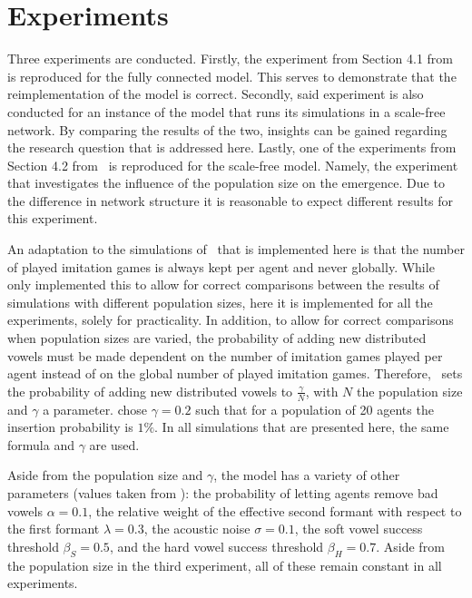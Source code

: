 \documentclass[11pt]{article}
\begin{document}
\section{Experiments\label{sec:exp}}
Three experiments are conducted. Firstly, the experiment from Section 4.1
from~ is reproduced for the fully connected model. This serves to demonstrate that the
reimplementation of the model is correct. Secondly, said experiment is also conducted for an instance of the model that runs its
simulations in a scale-free network. By comparing the results of the two, insights can be gained regarding the research question that
is addressed here. Lastly, one of the experiments from Section 4.2 from~ is reproduced for
the scale-free model. Namely, the experiment that investigates the influence of the population size on the emergence.
Due to the difference in network structure it is reasonable to expect different results for this experiment.

An adaptation to the simulations of~ that is
implemented here is that the number of played imitation games is always kept per agent and never globally.
While~ only implemented this to allow for correct comparisons
between the results of simulations with different population sizes, here it is implemented for all the experiments, solely for practicality.
In addition, to allow for correct comparisons when population sizes are varied, the probability of adding new distributed vowels must be made dependent on the
number of imitation games played per agent instead of on the global number of played imitation games. Therefore,~
sets the probability of adding new distributed vowels to $\frac{\gamma}{N}$, with $N$ the population size and $\gamma$ a parameter.
 chose $\gamma=0.2$ such that for a population of 20 agents the insertion probability is $1\%$.
In all simulations that are presented here, the same formula and $\gamma$ are used.

Aside from the population size and $\gamma$, the model has a variety of other parameters (values taken from ): the probability of letting agents
remove bad vowels $\alpha=0.1$, the relative weight of the effective second formant with respect to the first formant $\lambda=0.3$, the acoustic noise $\sigma=0.1$, the soft vowel success
threshold $\beta_S=0.5$, and the hard vowel success threshold $\beta_H=0.7$.
Aside from the population size in the third experiment, all of these remain constant in all experiments.
\end{document}
